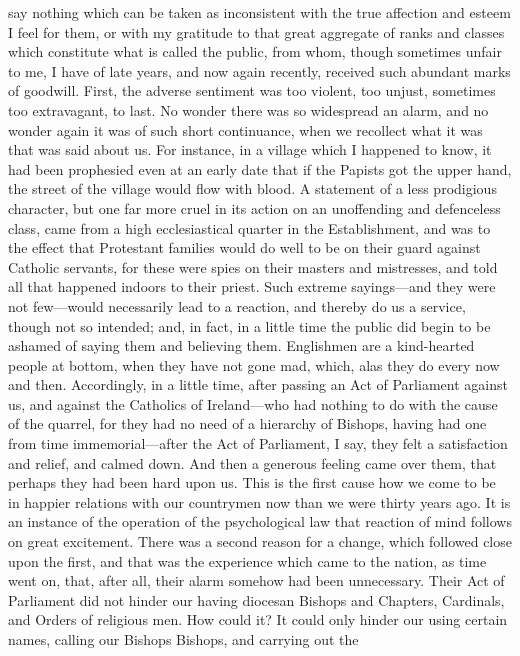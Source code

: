 say nothing which can be taken as inconsistent with the true affection
and esteem I feel for them, or with my gratitude to that great
aggregate of ranks and classes which constitute what is called the
public, from whom, though sometimes unfair to me, I have of late
years, and now again recently, received such abundant marks of
goodwill. First, the adverse sentiment was too violent, too unjust,
sometimes too extravagant, to last. No wonder there was so widespread
an alarm, and no wonder again it was of such short continuance, when
we recollect what it was that was said about us. For instance, in a
village which I happened to know, it had been prophesied even at an
early date that if the Papists got the upper hand, the street of the
village would flow with blood. A statement of a less prodigious
character, but one far more cruel in its action on an unoffending and
defenceless class, came from a high ecclesiastical quarter in the
Establishment, and was to the effect that Protestant families would do
well to be on their guard against Catholic servants, for these were
spies on their masters and mistresses, and told all that happened
indoors to their priest. Such extreme sayings—and they were not
few—would necessarily lead to a reaction, and thereby do us a
service, though not so intended; and, in fact, in a little time the
public did begin to be ashamed of saying them and believing them.
Englishmen are a kind-hearted people at bottom, when they have not
gone mad, which, alas they do every now and then. Accordingly, in a
little time, after passing an Act of Parliament against us, and
against the Catholics of Ireland—who had nothing to do with the
cause of the quarrel, for they had no need of a hierarchy of Bishops,
having had one from time immemorial—after the Act of Parliament, I
say, they felt a satisfaction and relief, and calmed down. And then a
generous feeling came over them, that perhaps they had been hard upon
us. This is the first cause how we come to be in happier relations
with our countrymen now than we were thirty years ago. It is an instance of the operation of the psychological law that reaction of
mind follows on great excitement. There was a second reason for a
change, which followed close upon the first, and that was the
experience which came to the nation, as time went on, that, after all,
their alarm somehow had been unnecessary. Their Act of Parliament did
not hinder our having diocesan Bishops and Chapters, Cardinals, and
Orders of religious men. How could it? It could only hinder our using
certain names, calling our Bishops Bishops, and carrying out the
